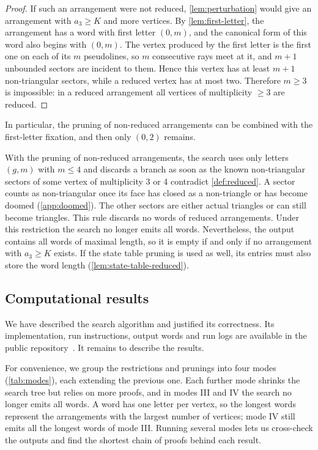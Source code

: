 \begin{proof}
If such an arrangement were not reduced, \cref{lem:perturbation} would give an arrangement with $a_3\ge K$ and more vertices.
By \cref{lem:first-letter}, the arrangement has a word with first letter $(0,m)$, and the canonical form of this word also begins with $(0,m)$.
The vertex produced by the first letter is the first one on each of its $m$ pseudolines, so $m$ consecutive rays meet at it, and $m+1$ unbounded sectors are incident to them.
Hence this vertex has at least $m+1$ non-triangular sectors, while a reduced vertex has at most two.
Therefore $m\ge3$ is impossible: in a reduced arrangement all vertices of multiplicity $\ge3$ are reduced.
\end{proof}

In particular, the pruning of non-reduced arrangements can be combined with the first-letter fixation, and then only $(0,2)$ remains.

With the pruning of non-reduced arrangements, the search uses only letters $(g,m)$ with $m\le4$ and discards a branch as soon as the known non-triangular sectors of some vertex of multiplicity 3 or 4 contradict \cref{def:reduced}.
A sector counts as non-triangular once its face has closed as a non-triangle or has become doomed (\cref{app:doomed}). The other sectors are either actual triangles or can still become triangles.
This rule discards no words of reduced arrangements.
Under this restriction the search no longer emits all words.
Nevertheless, the output contains all words of maximal length, so it is empty if and only if no arrangement with $a_3\ge K$ exists.
If the state table pruning is used as well, its entries must also store the word length (\cref{lem:state-table-reduced}).

\subsection{Computational results}

We have described the search algorithm and justified its correctness. Its implementation, run instructions, output words and run logs are available in the public repository~\cite{nonsimple-arrangements}. It remains to describe the results.

For convenience, we group the restrictions and prunings into four modes (\cref{tab:modes}), each extending the previous one.
Each further mode shrinks the search tree but relies on more proofs, and in modes III and IV the search no longer emits all words.
A word has one letter per vertex, so the longest words represent the arrangements with the largest number of vertices; mode IV still emits all the longest words of mode III.
Running several modes lets us cross-check the outputs and find the shortest chain of proofs behind each result.

